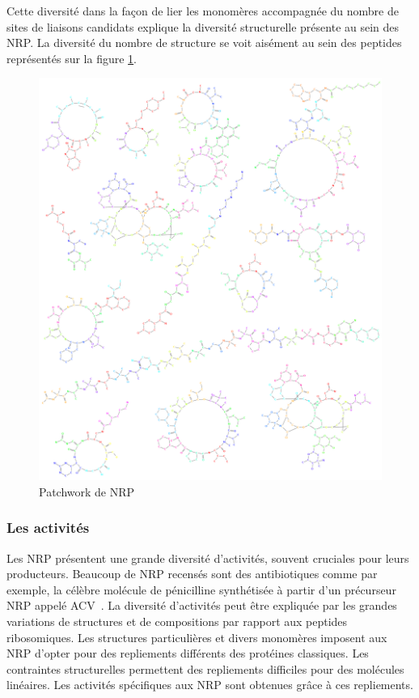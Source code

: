 Cette diversité dans la façon de lier les monomères accompagnée du nombre de sites de liaisons candidats explique la diversité structurelle présente au sein des NRP.
La diversité du nombre de structure se voit aisément au sein des peptides représentés sur la figure \ref{peps_example}.

\begin{figure}[h!]
  \begin{center}
    \includegraphics[width=450px]{Figures/bio/Intro/NRPs/peps.png}
    \caption{\label{peps_example}Patchwork de NRP}
  \end{center}
\end{figure}


\subsubsection{Les activités}

Les NRP présentent une grande diversité d'activités, souvent cruciales pour leurs producteurs.
Beaucoup de NRP recensés sont des antibiotiques comme par exemple, la célèbre molécule de pénicilline synthétisée à partir d'un précurseur NRP appelé ACV~\cite{queener_molecular_1990}.
La diversité d'activités peut être expliquée par les grandes variations de structures et de compositions par rapport aux peptides ribosomiques.
Les structures particulières et divers monomères imposent aux NRP d'opter pour des repliements différents des protéines classiques.
Les contraintes structurelles permettent des repliements difficiles pour des molécules linéaires.
Les activités spécifiques aux NRP sont obtenues grâce à ces repliements.

